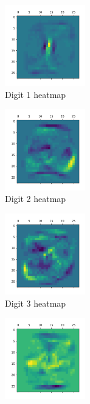 \documentclass[a4paper]{article}    %
\begin{document}
\begin{figure}[H]
    \centering
    \begin{subfigure}{0.24\textwidth}
        \centering
        \includegraphics[width=3.5cm]{digit_1}
        \caption{Digit 1 heatmap}
        \label{fig:digit_1}
    \end{subfigure}
    \hfill
    \begin{subfigure}{0.24\textwidth}
        \centering
        \includegraphics[width=3.5cm]{digit_2}
        \caption{Digit 2 heatmap}
        \label{fig:digit_2}
    \end{subfigure}
    \hfill
    \begin{subfigure}{0.24\textwidth}
        \centering
        \includegraphics[width=3.5cm]{digit_3}
        \caption{Digit 3 heatmap}
        \label{fig:digit_3}
    \end{subfigure}
    \hfill
    \begin{subfigure}{0.24\textwidth}
        \centering
        \includegraphics[width=3.5cm]{digit_4}

\end{subfigure}
\end{figure}
\end{document}
